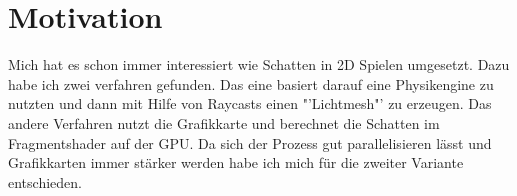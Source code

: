 \chapter{Motivation}
Mich hat es schon immer interessiert wie Schatten in 2D Spielen umgesetzt.
Dazu habe ich zwei verfahren gefunden. Das eine basiert darauf eine Physikengine zu nutzten und
dann mit Hilfe von Raycasts einen "'Lichtmesh"' zu erzeugen. Das andere Verfahren 
nutzt die Grafikkarte und berechnet die Schatten im Fragmentshader auf der GPU.
Da sich der Prozess gut parallelisieren lässt und Grafikkarten immer stärker werden habe ich mich für die zweiter Variante entschieden. 
